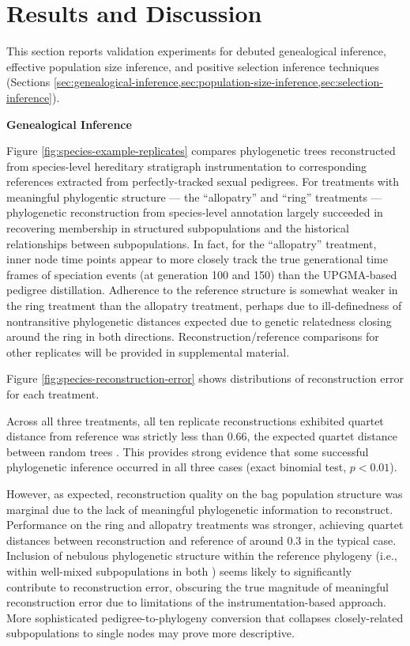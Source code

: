 \section{Results and Discussion} \label{sec:results}

This section reports validation experiments for debuted genealogical inference, effective population size inference, and positive selection inference techniques (Sections \ref{sec:genealogical-inference,sec:population-size-inference,sec:selection-inference}).

\textbf{Genealogical Inference}

Figure \ref{fig:species-example-replicates} compares phylogenetic trees reconstructed from species-level hereditary stratigraph instrumentation to corresponding references extracted from perfectly-tracked sexual pedigrees.
For treatments with meaningful phylogentic structure --- the ``allopatry'' and ``ring'' treatments --- phylogenetic reconstruction from species-level annotation largely succeeded in recovering membership in structured subpopulations and the historical relationships between subpopulations.
In fact, for the ``allopatry'' treatment, inner node time points appear to more closely track the true generational time frames of speciation events (at generation 100 and 150) than the UPGMA-based pedigree distillation.
Adherence to the reference structure is somewhat weaker in the ring treatment than the allopatry treatment, perhaps due to ill-definedness of nontransitive phylogenetic distances expected due to genetic relatedness closing around the ring in both directions.
Reconstruction/reference comparisons for other replicates will be provided in supplemental material.



Figure \ref{fig:species-reconstruction-error} shows distributions of reconstruction error for each treatment.

Across all three treatments, all ten replicate reconstructions exhibited quartet distance from reference was strictly less than 0.66, the expected quartet distance between random trees \citep{smith2020information}.
This provides strong evidence that some successful phylogenetic inference occurred in all three cases (exact binomial test, $p < 0.01$).

However, as expected, reconstruction quality on the bag population structure was marginal due to the lack of meaningful phylogenetic information to reconstruct.
Performance on the ring and allopatry treatments was stronger, achieving quartet distances between reconstruction and reference of around 0.3 in the typical case.
Inclusion of nebulous phylogenetic structure within the reference phylogeny (i.e., within well-mixed subpopulations in both ) seems likely to significantly contribute to reconstruction error, obscuring the true magnitude of meaningful reconstruction error due to limitations of the instrumentation-based approach.
More sophisticated pedigree-to-phylogeny conversion that collapses closely-related subpopulations to single nodes may prove more descriptive.

